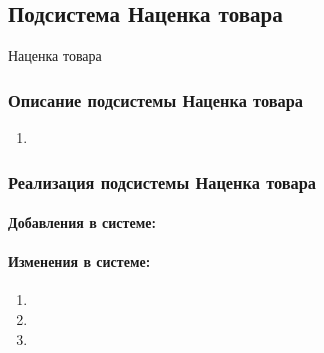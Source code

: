 \subsection{Подсистема Наценка товара} \hypertarget{4_1}{Наценка товара}
\subsubsection{Описание подсистемы Наценка товара}
\begin{enumerate}	
	\item 
\end{enumerate}
\subsubsection{Реализация подсистемы Наценка товара}
\paragraph{Добавления в системе:}
\paragraph{Изменения в системе:}
\begin{enumerate}	
	\item 
	\item 
	\item 
\end{enumerate}